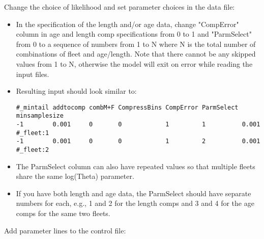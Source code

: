 Change the choice of likelihood and set parameter choices in the data
file: 

\begin{itemize}
\item In the specification of the length and/or age data, change
"CompError" column in age and length comp specifications from 0 to 1 and
"ParmSelect" from 0 to a sequence of numbers from 1 to N where N is the
total number of combinations of fleet and age/length. Note that there
cannot be any skipped values from 1 to N, otherwise the model will exit
on error while reading the input files. 
	
\item Resulting input should look similar to:
\begin{small}
\begin{verbatim}
#_mintail addtocomp combM+F CompressBins CompError ParmSelect minsamplesize   
-1        0.001     0       0            1         1          0.001 #_fleet:1
-1        0.001     0       0            1         2          0.001 #_fleet:2
\end{verbatim}
\end{small}

\item The ParmSelect column can also have repeated values so that
multiple fleets share the same log(Theta) parameter. 
	
\item If you have both length and age data, the ParmSelect should have
separate numbers for each, e.g., 1 and 2 for the length comps and 3 and 4
for the age comps for the same two fleets. 
	
\end{itemize}

Add parameter lines to the control file:

